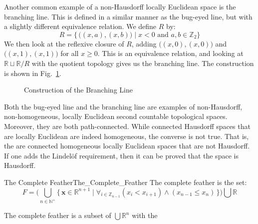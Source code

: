 \documentclass[oneside]{book}                                                  %
\begin{document}
            Another common example of a non-Hausdorff locally Euclidean space is
            the branching line. This is defined in a similar manner as the
            bug-eyed line, but with a slightly different equivalence relation.
            We define $R$ by:
            \begin{equation}
                R=\big\{\,\big((x,a),(x,b)\big)\;|\;
                    x<0\textrm{ and }a,b\in\mathbb{Z}_{2}\big\}
            \end{equation}
            We then look at the reflexive closure of $R$, adding
            $\big((x,0),(x,0)\big)$ and $\big((x,1),(x,1)\big)$ for all
            $x\geq{0}$. This is an equivalence relation, and looking at
            $\mathbb{R}\sqcup\mathbb{R}/R$ with the quotient topology gives us
            the branching line. The construction is shown in
            Fig.~\ref{fig:Construction_of_Branching_Line}.
            \begin{figure}[H]
                \centering
                \captionsetup{type=figure}
                
                \caption{Construction of the Branching Line}
                \label{fig:Construction_of_Branching_Line}
            \end{figure}
            Both the bug-eyed line and the branching line are examples of
            non-Hausdorff, non-homogeneous, locally Euclidean second countable
            topological spaces. Moreover, they are both path-connected. While
            connected Hausdorff spaces that are locally Euclidean are indeed
            homogeneous, the converse is not true. That is, the are connected
            homogeneous locally Euclidean spaces that are not Hausdorff. If one
            adds the Lindel\"{o}f requirement, then it can be proved that the
            space is Hausdorff.
            \begin{fdefinition}{The Complete Feather}{The_Complete_Feather}
                The complete feather is the set:
                \begin{equation*}
                    F=\Big(\bigcup_{n\in\mathbb{N}^{+}}
                        \big\{\,\mathbf{x}\in\mathbb{R}^{n+1}\;|\;
                            \forall_{i\in\mathbb{Z}_{n-1}}(x_{i}<x_{i+1})
                            \land(x_{n-1}\leq{x}_{n})\,\big\}\Big)
                        \bigcup\mathbb{R}
                \end{equation*}
            \end{fdefinition}
            The complete feather is a subset of $\bigcup\mathbb{R}^{n}$ with the
\end{document}
